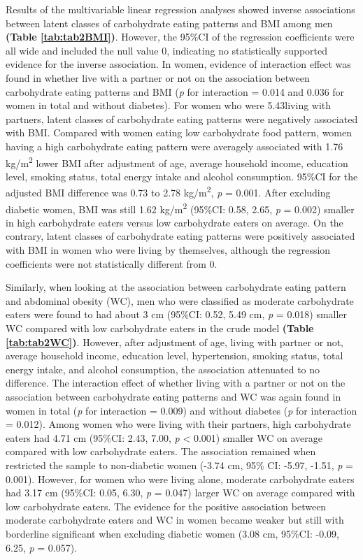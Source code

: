 

Results of the multivariable linear regression analyses showed inverse associations between latent classes of carbohydrate eating patterns and BMI among men \textbf{(Table \ref{tab:tab2BMI})}. However, the 95\%CI of the regression coefficients were all wide and included the null value 0, indicating no statistically supported evidence for the inverse association. In women, evidence of interaction effect was found in whether live with a partner or not on the association between carbohydrate eating patterns and BMI (\textit{p} for interaction = 0.014 and 0.036 for women in total and without diabetes). For women who were 5.43living with partners, latent classes of carbohydrate eating patterns were negatively associated with BMI. Compared with women eating low carbohydrate food pattern, women having a high carbohydrate eating pattern were averagely associated with 1.76 kg/m\textsuperscript{2} lower BMI after adjustment of age, average household income, education level, smoking status, total energy intake and alcohol consumption. 95\%CI for the adjusted BMI difference was 0.73 to 2.78 kg/m\textsuperscript{2}, \textit{p} = 0.001. After excluding diabetic women, BMI was still 1.62 kg/m\textsuperscript{2} (95\%CI: 0.58, 2.65, \textit{p} = 0.002) smaller in high carbohydrate eaters versus low carbohydrate eaters on average. On the contrary, latent classes of carbohydrate eating patterns were positively associated with BMI in women who were living by themselves, although the regression coefficients were not statistically different from 0.


Similarly, when looking at the association between carbohydrate eating pattern and abdominal obesity (WC), men who were classified as moderate carbohydrate eaters were found to had about 3 cm (95\%CI: 0.52, 5.49 cm, \textit{p} = 0.018) smaller WC compared with low carbohydrate eaters in the crude model \textbf{(Table \ref{tab:tab2WC})}. However, after adjustment of age, living with partner or not, average household income, education level, hypertension, smoking status, total energy intake, and alcohol consumption, the association attenuated to no difference. The interaction effect of whether living with a partner or not on the association between carbohydrate eating patterns and WC was again found in women in total (\textit{p} for interaction = 0.009) and without diabetes (\textit{p} for interaction = 0.012). Among women who were living with their partners, high carbohydrate eaters had 4.71 cm (95\%CI: 2.43, 7.00, \textit{p} < 0.001) smaller WC on average compared with low carbohydrate eaters. The association remained when restricted the sample to non-diabetic women (-3.74 cm, 95\% CI: -5.97, -1.51,  \textit{p} = 0.001). However, for women who were living alone, moderate carbohydrate eaters had 3.17 cm (95\%CI: 0.05, 6.30, \textit{p} = 0.047) larger WC on average compared with low carbohydrate eaters. The evidence for the positive association between moderate carbohydrate eaters and WC in women became weaker but still with borderline significant when excluding diabetic women (3.08 cm, 95\%CI: -0.09, 6.25, \textit{p} = 0.057).
   


